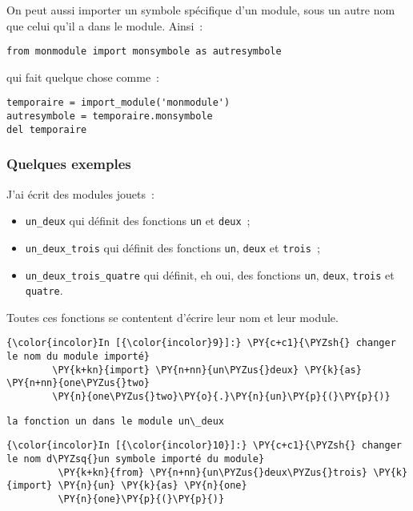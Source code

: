     On peut aussi importer un symbole spécifique d'un module, sous un autre
nom que celui qu'il a dans le module. Ainsi~:

    \begin{verbatim}
from monmodule import monsymbole as autresymbole
\end{verbatim}

    qui fait quelque chose comme~:

    \begin{verbatim}
temporaire = import_module('monmodule')
autresymbole = temporaire.monsymbole
del temporaire
\end{verbatim}

    \hypertarget{quelques-exemples}{%
\subsubsection{Quelques exemples}\label{quelques-exemples}}

    J'ai écrit des modules jouets~:
    
\begin{itemize}
	\item 
	\texttt{un\_deux} qui définit des fonctions \texttt{un} et \texttt{deux}~;
	\item
	 \texttt{un\_deux\_trois} qui définit des fonctions \texttt{un}, \texttt{deux} et \texttt{trois}~;
	 \item
	\texttt{un\_deux\_trois\_quatre} qui définit, eh oui, des fonctions
	\texttt{un}, \texttt{deux}, \texttt{trois} et \texttt{quatre}.
\end{itemize}    

Toutes ces fonctions se contentent d'écrire leur nom et leur module.

    \begin{Verbatim}[commandchars=\\\{\}]
{\color{incolor}In [{\color{incolor}9}]:} \PY{c+c1}{\PYZsh{} changer le nom du module importé}
        \PY{k+kn}{import} \PY{n+nn}{un\PYZus{}deux} \PY{k}{as} \PY{n+nn}{one\PYZus{}two}
        \PY{n}{one\PYZus{}two}\PY{o}{.}\PY{n}{un}\PY{p}{(}\PY{p}{)}
\end{Verbatim}


    \begin{Verbatim}[commandchars=\\\{\}]
la fonction un dans le module un\_deux

    \end{Verbatim}

    \begin{Verbatim}[commandchars=\\\{\}]
{\color{incolor}In [{\color{incolor}10}]:} \PY{c+c1}{\PYZsh{} changer le nom d\PYZsq{}un symbole importé du module}
         \PY{k+kn}{from} \PY{n+nn}{un\PYZus{}deux\PYZus{}trois} \PY{k}{import} \PY{n}{un} \PY{k}{as} \PY{n}{one}
         \PY{n}{one}\PY{p}{(}\PY{p}{)}
\end{Verbatim}


